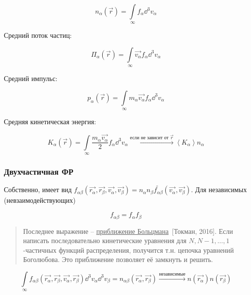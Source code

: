 \documentclass[10pt, a4paper]{article}
\newcommand{\Tokman}{~[Токман, 2016]}
\begin{document}
\begin{equation*}
	n_\alpha(\vec{r}) = \int\limits_{\infty}f_\alpha \dd^3v_\alpha
\end{equation*}

Средний поток частиц:

\begin{equation*}
	\Pi_\alpha(\vec{r}) =	\int\limits_{\infty}\overrightarrow{v_\alpha}f_\alpha \dd^3v_\alpha
\end{equation*}

Средний импульс:

\begin{equation*}
	p_\alpha(\vec{r}) = \int\limits_{\infty}m_\alpha\overrightarrow{v_\alpha}f_\alpha \dd^3v_\alpha
\end{equation*}

Средняя кинетическая энергия:

\begin{equation*}
	K_\alpha(\vec{r}) = \int\limits_{\infty}\frac{m_\alpha\overrightarrow{v_\alpha}}{2}f_\alpha \dd^3v_\alpha \xrightarrow{\text{если не зависит от $\vec{r}$}} \left\langle K_\alpha\right\rangle n_\alpha
\end{equation*}

\subsubsection{Двухчастичная ФР}

Собственно, имеет вид $f_{\alpha\beta}(\overrightarrow{r_\alpha}, \overrightarrow{r_\beta}, \overrightarrow{v_\alpha}, \overrightarrow{v_\beta}) = n_\alpha n_\beta \widetilde{f_{\alpha\beta}}(\overrightarrow{v_\alpha}, \overrightarrow{v_\beta})$. Для независимых (невзаимодействующих)

\begin{equation} \label{eq:Boltzmann_relation}
	f_{\alpha\beta} = f_\alpha f_\beta
\end{equation}

\begin{quotation}
	Последнее выражение -- \uline{приближение Больцмана}\Tokman. Если написать последовательно кинетические уравнения для $N, N-1, \ldots, 1$-частичных функций распределения, получится т.н. цепочка уравнений Боголюбова. Это приближение позволяет её замкнуть и решить. 
\end{quotation}
	
\begin{equation*}
	\int\limits_{\infty}f_{\alpha\beta}(\overrightarrow{r_\alpha}, \overrightarrow{r_\beta}, \overrightarrow{v_\alpha}, \overrightarrow{r_\beta})\dd^3v_\alpha \dd^3v_\beta = n_{\alpha\beta}(\overrightarrow{r_\alpha}, \overrightarrow{r_\beta}) \xrightarrow{\text{независимые}} n(\overrightarrow{r_\alpha}) n(\overrightarrow{r_\beta})
\end{equation*}
	
\end{document}
